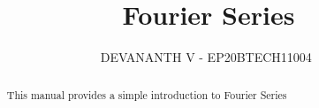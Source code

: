 \documentclass[journal,12pt,twocolumn]{IEEEtran}
\renewcommand\thesection{\arabic{section}}
\begin{document}
	\let\StandardTheFigure\thefigure
	\renewcommand{\thefigure}{\theproblem}
	
	
	
	\def\putbox#1#2#3{\makebox[0in][l]{\makebox[#1][l]{}\raisebox{\baselineskip}[0in][0in]{\raisebox{#2}[0in][0in]{#3}}}}
	\def\rightbox#1{\makebox[0in][r]{#1}}
	\def\centbox#1{\makebox[0in]{#1}}
	\def\topbox#1{\raisebox{-\baselineskip}[0in][0in]{#1}}
	\def\midbox#1{\raisebox{-0.5\baselineskip}[0in][0in]{#1}}
	
	\vspace{3cm}
	
	\title{ 
		Fourier Series
	}
	
	
	
	\author{ DEVANANTH V - EP20BTECH11004 $^{}$}
	
	\maketitle
		
	
	\tableofcontents
	
	
	\renewcommand{\thefigure}{\theenumi}
	\renewcommand{\thetable}{\theenumi}
	
	
	
	\bigskip
	
	\begin{abstract}
		This manual provides a simple introduction to Fourier Series
	\end{abstract}
\end{document}
